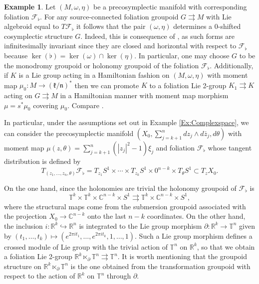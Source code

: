 \documentclass[
  a4paper, 
  reqno, 
  oneside, 
  12pt
]{amsart}
\theoremstyle{definition}
\newtheorem{example}[theorem]{Example}
\theoremstyle{remark}
\newcommand{\rr}{\rightrightarrows}
\begin{document}
\begin{example}
\label{Ex:precosymplecticManifoldwithFoliaiton}
Let $(M,\omega,\eta)$ be a precosymplectic manifold with corresponding foliation $\mathcal{F}_\flat$. For any source-connected foliation groupoid $G\rr M$ with Lie algebroid equal to $T\mathcal{F}_\flat$ it follows that the pair $(\omega,\eta)$ determines a 0-shifted cosymplectic structure $G$. Indeed, this is consequence of \cite[Lem. 5.3.8]{HoffmanSjamaar}, as such forms are infinitesimally invariant since they are closed and horizontal with respect to $\mathcal{F}_\flat$ because $\ker(\flat)=\ker(\omega)\cap \ker(\eta)$. In particular, one may choose $G$ to be the monodromy groupoid or holonomy groupoid of the foliation $\mathcal{F}_\flat$. Additionally, if $K$ is a Lie group acting in a Hamiltonian fashion on $(M,\omega,\eta)$ with moment map $\mu_0:M\to (\mathfrak{k}/\mathfrak{n})^\ast$ then we can promote $K$ to a foliation Lie 2-group $K_1\rr K$ acting on $G\rr M$ in a Hamiltonian manner with moment map morphism $\mu=s^\ast \mu_0$ covering $\mu_0$. Compare \cite[s. 7.2]{HoffmanSjamaar}.

In particular, under the assumptions set out in Example \ref{Ex:Complexspace}, we can consider the precosymplectic manifold $(X_0,\sum_{j=k+1}^ndz_j\wedge d\bar z_j, d\theta)$ with moment map  $\mu(z,\theta)=\sum_{j=k+1}^n(|z_j|^2-1)\xi_j$ and foliation $\mathcal{F}_\flat$ whose tangent distribution is defined by $$T_{(z_1,\ldots, z_n,\theta)}\mathcal{F}_\flat=T_{z_1}S^1\times \cdots \times T_{z_k}S^1\times 0^{n-k}\times T_\theta S^1\subset T_{z}X_0.$$

On the one hand, since the holonomies are trivial the holonomy groupoid of $\mathcal F_\flat$ is 
$$\mathbb{T}^k\times \mathbb{T}^k\times \mathbb{C}^{n-k}\times S^1\rr \mathbb{T}^k\times \mathbb{C}^{n-k}\times S^1,$$
where the structural maps come from the submersion groupoid associated with the projection $X_0\to \mathbb{C}^{n-k}$ onto the last $n-k$ coordinates. On the other hand, the inclusion $i:\mathbb{R}^k\hookrightarrow \mathbb{R}^n$ is integrated to the Lie group morphism $\partial:\mathbb{R}^k\to \mathbb{T}^n$ given by $(t_1,\ldots, t_k)\mapsto (e^{2\pi i t_1},\ldots,e^{2\pi i t_k},1,\ldots,1)$. Such a Lie group morphism defines a crossed module of Lie group with the trivial action of $\mathbb{T}^n$ on $\mathbb{R}^k$, so that we obtain a foliation Lie 2-group $\mathbb{R}^k\ltimes_\partial \mathbb{T}^n\rr\mathbb{T}^n$. It is worth mentioning that the groupoid structure on $\mathbb{R}^k\ltimes_\partial \mathbb{T}^n$ is the one obtained from the transformation groupoid with respect to the action of $\mathbb{R}^k$ on $\mathbb{T}^n$ through $\partial$.
\end{example}
\end{document}
